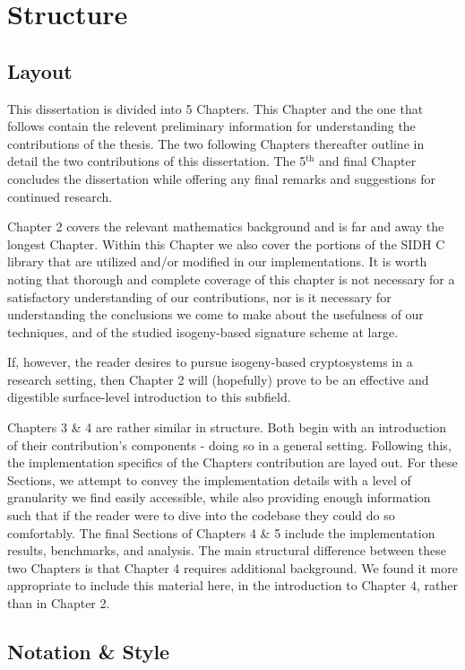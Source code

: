 \section{Structure}


\subsection{Layout}

This dissertation is divided into 5 Chapters. This Chapter and the one that follows contain the relevent preliminary information for understanding the contributions of the thesis. The two following Chapters thereafter outline in detail the two contributions of this dissertation. The 5$^{\text{th}}$ and final Chapter concludes the dissertation while offering any final remarks and suggestions for continued research.

Chapter 2 covers the relevant mathematics background and is far and away the longest Chapter. Within this Chapter we also cover the portions of the SIDH C library that are utilized and/or modified in our implementations. It is worth noting that thorough and complete coverage of this chapter is not necessary for a satisfactory understanding of our contributions, nor is it necessary for understanding the conclusions we come to make about the usefulness of our techniques, and of the studied isogeny-based signature scheme at large.

If, however, the reader desires to pursue isogeny-based cryptosystems in a research setting, then Chapter 2 will (hopefully) prove to be an effective and digestible surface-level introduction to this subfield.  

Chapters 3 \& 4 are rather similar in structure. Both begin with an introduction of their contribution's components - doing so in a general setting. Following this, the implementation specifics of the Chapters contribution are layed out. For these Sections, we attempt to convey the implementation details with a level of granularity we find easily accessible, while also providing enough information such that if the reader were to dive into the codebase they could do so comfortably. The final Sections of Chapters 4 \& 5 include the implementation results, benchmarks, and analysis. The main structural difference between these two Chapters is that Chapter 4 requires additional background. We found it more appropriate to include this material here, in the introduction to Chapter 4, rather than in Chapter 2.

\subsection{Notation \& Style}

